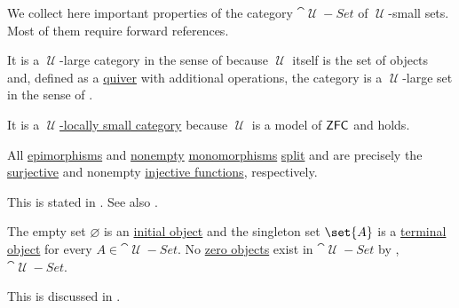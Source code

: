 \begin{proposition}\label{thm:category_of_small_sets_properites}
  We collect here important properties of the category \hyperref[def:category_of_small_sets]{\( \cat{\mscrU-Set} \)} of \( \mscrU \)-small sets. Most of them require forward references.

  \begin{thmenum}
     It is a \( \mscrU \)-large category in the sense of  because \( \mscrU \) itself is the set of objects and, defined as a \hyperref[def:quiver]{quiver} with additional operations, the category is a \( \mscrU \)-large set in the sense of .

     It is a \hyperref[def:category_size]{\( \mscrU \)-locally small category} because \( \mscrU \) is a model of \hyperref[def:zfc]{\( \textsf{ZFC} \)} and  holds.

     All \hyperref[def:morphism_invertibility/right_cancellative]{epimorphisms} and \hyperref[def:multi_valued_function/empty]{nonempty} \hyperref[def:morphism_invertibility/left_cancellative]{monomorphisms} \hyperref[def:morphism_invertibility/left_invertible]{split} and are precisely the \hyperref[def:function_invertibility/surjective]{surjective} and nonempty \hyperref[def:function_invertibility/injective]{injective functions}, respectively.

    This is stated in . See also .

     The empty set \( \varnothing \) is an \hyperref[def:zero_objects/initial]{initial object} and the singleton set \( \set{ A } \) is a \hyperref[def:zero_objects/terminal]{terminal object} for every \( A \in \cat{\mscrU-Set} \). No \hyperref[def:zero_objects/zero]{zero objects} exist in \( \cat{\mscrU-Set} \) by , \( \cat{\mscrU-Set} \).

    This is discussed in .
  \end{thmenum}
\end{proposition}

